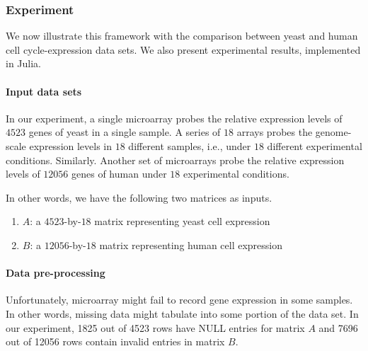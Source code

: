 \subsubsection{Experiment}

We now illustrate this framework with the comparison between yeast and human cell cycle-expression data sets. \cite{tavazoie1999systematic} We also present experimental results, implemented in Julia. 


\paragraph{Input data sets}
In our experiment, a single microarray probes the relative expression levels of $4523$ genes of yeast in a single sample. A series of $18$ arrays probes the genome-scale expression levels in $18$ different samples, i.e., under $18$ different experimental conditions. Similarly. Another set of microarrays probe the relative expression levels of $12056$ genes of human under $18$ experimental conditions. 

In other words, we have the following two matrices as inputs.
\begin{enumerate}
	\item $A$: a $4523$-by-$18$ matrix representing yeast cell expression
	\item $B$: a $12056$-by-$18$ matrix representing human cell expression
\end{enumerate}

\paragraph{Data pre-processing}
Unfortunately, microarray might fail to record gene expression in some samples. In other words, missing data might tabulate into some portion of the data set. In our experiment, 1825 out of 4523 rows have NULL entries for matrix $A$ and 7696 out of 12056 rows contain invalid entries in matrix $B$. 

